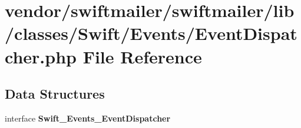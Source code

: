 \section{vendor/swiftmailer/swiftmailer/lib/classes/\+Swift/\+Events/\+Event\+Dispatcher.php File Reference}
\label{swiftmailer_2swiftmailer_2lib_2classes_2_swift_2_events_2_event_dispatcher_8php}
\subsection*{Data Structures}
\begin{DoxyCompactItemize}
\item 
interface {\bf Swift\+\_\+\+Events\+\_\+\+Event\+Dispatcher}
\end{DoxyCompactItemize}
